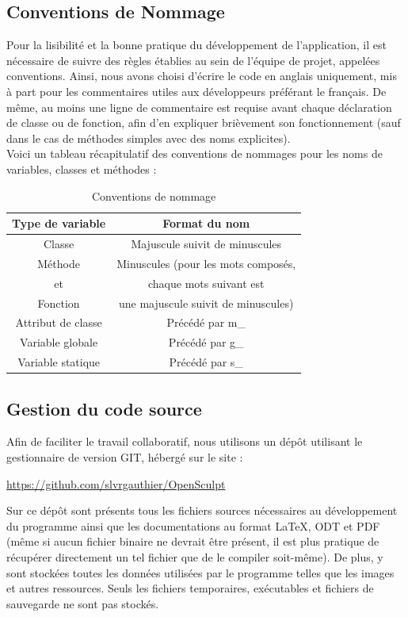 \documentclass[a4paper]{memoir}
\begin{document}
			\subsection{Conventions de Nommage}
				Pour la lisibilité et la bonne pratique du développement de l'application, il est nécessaire de suivre des règles établies au sein de 
				l'équipe de projet, appelées conventions. Ainsi, nous avons choisi d'écrire le code en anglais uniquement, mis à part pour les commentaires 
				utiles aux développeurs préférant le français. De même, au moins une ligne de commentaire est requise avant chaque déclaration de classe ou 
				de fonction, afin d'en expliquer brièvement son fonctionnement (sauf dans le cas de méthodes simples avec des noms explicites).\\
				Voici un tableau récapitulatif des conventions de nommages pour les noms de variables, classes et méthodes :
				\begin{table}[H]
					\begin{small}
						\hspace{1,5cm}
						\begin{tabular}{| c | c |}
							\hline
							\textbf{Type de variable} & \textbf{Format du nom}\\
							\hline
							Classe & Majuscule suivit de minuscules\\
							\hline
							Méthode & Minuscules (pour les mots composés,\\
							et & chaque mots suivant est\\
							Fonction & une majuscule suivit de minuscules)\\
							\hline
							Attribut de classe & Précédé par m\_\\
							\hline
							Variable globale & Précédé par g\_\\
							\hline
							Variable statique & Précédé par s\_\\
							\hline
						\end{tabular}
					\end{small}
					\label{tab:nommage}
					\caption{Conventions de nommage}
				\end{table}

			\subsection{Gestion du code source}
				Afin de faciliter le travail collaboratif, nous utilisons un dépôt utilisant le gestionnaire de version GIT, hébergé sur le site :
				\begin{center}
					\url{https://github.com/slvrgauthier/OpenSculpt}
					\label{url:github}
				\end{center}
				Sur ce dépôt sont présents tous les fichiers sources nécessaires au développement du programme ainsi que les documentations au format 
				\LaTeX, ODT et PDF (même si aucun fichier binaire ne devrait être présent, il est plus pratique de récupérer directement un tel fichier 
				que de le compiler soit-même). De plus, y sont stockées toutes les données utilisées par le programme telles que les images et autres 
				ressources. Seuls les fichiers temporaires, exécutables et fichiers de sauvegarde ne sont pas stockés.
\end{document}
